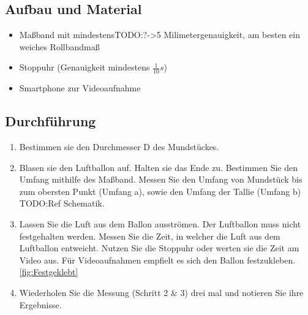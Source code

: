 \documentclass{article}
\begin{document}
    \subsection{Aufbau und Material}
    \begin{itemize}
        \item Maßband mit mindestensTODO:?->5 Milimetergenauigkeit, am besten ein weiches Rollbandmaß
        \item Stoppuhr (Genauigkeit mindestens \( \frac{1}{10}s \))
        \item Smartphone zur Videoaufnahme
    \end{itemize}

    \subsection{Durchführung}
    \begin{enumerate}
        \item Bestimmen sie den Durchmesser D des Mundstückes.
        \item Blasen sie den Luftballon auf. Halten sie das Ende zu. Bestimmen Sie den Umfang mithilfe des Maßband.
        Messen Sie den Umfang von Mundstück bis zum obersten Punkt (Umfang a), sowie den Umfang der \glqq{}Tallie\grqq{} (Umfang b) TODO:Ref Schematik.
        \item Lassen Sie die Luft aus dem Ballon ausströmen. Der Luftballon muss nicht festgehalten werden.
        Messen Sie die Zeit, in welcher die Luft aus dem Luftballon entweicht.
        Nutzen Sie die Stoppuhr oder werten sie die Zeit am Video aus. Für Videoaufnahmen empfielt es sich den Ballon festzukleben.\ref{fig:Festgeklebt}
        \item Wiederholen Sie die Messung (Schritt 2 \& 3) drei mal und notieren Sie ihre Ergebnisse.
    \end{enumerate}
\end{document}
